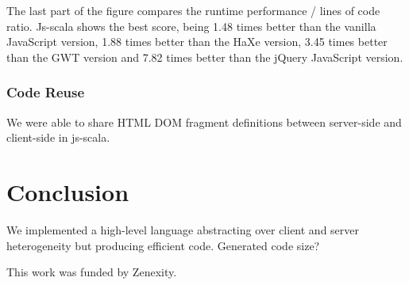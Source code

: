 \documentclass[preprint]{sigplanconf}
\begin{document}
The last part of the figure compares the runtime performance / lines of code ratio. Js-scala shows the best score,
being 1.48 times better than the vanilla JavaScript version, 1.88 times better than the HaXe version, 3.45 times
better than the GWT version and 7.82 times better than the jQuery JavaScript version.

\subsubsection{Code Reuse}

We were able to share HTML DOM fragment definitions between server-side and client-side in js-scala.

\section{Conclusion}
\label{discussion}

We implemented a high-level language abstracting over client and server heterogeneity but producing efficient code.
Generated code size?

%
%
\acks

This work was funded by Zenexity.



%
%
%
\end{document}
